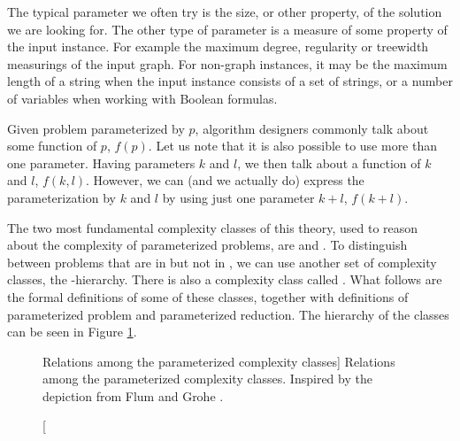 The typical parameter we often try is the size, or other property, of the solution we are looking for.
The other type of parameter is a measure of some property of the input instance.
For example the maximum degree, regularity or treewidth measurings of the input graph.
For non-graph instances, it may be the maximum length of a string when the input instance consists of a set of strings,
or a number of variables when working with Boolean formulas.

Given problem parameterized by $p$, algorithm designers commonly talk about some function of $p$, $f(p)$.
Let us note that it is also possible to use more than one parameter.
Having parameters $k$ and $l$, we then talk about a function of $k$ and $l$, $f(k,l)$.
However, we can (and we actually do) express the parameterization by $k$ and $l$ by using just one parameter $k+l$, $f(k+l)$.

The two most fundamental complexity classes of this theory, used to reason about the complexity of parameterized problems,
are \FPT and \XP.
To distinguish between \NPh problems that are in \XP but not in \FPT, we can use another set of complexity classes, the \W-hierarchy.
There is also a complexity class called \pNP.
What follows are the formal definitions of some of these classes, together with definitions of parameterized problem
and parameterized reduction.
The hierarchy of the classes can be seen in Figure \ref{fig:complexityClasses}.


\begin{figure}[t]
    \centering
    \caption
    [Relations among the parameterized complexity classes]
    {
        Relations among the parameterized complexity classes.
        Inspired by the depiction from Flum and Grohe \cite[p.~97]{Flum2006}.
    }
    \label{fig:complexityClasses}
\end{figure}


